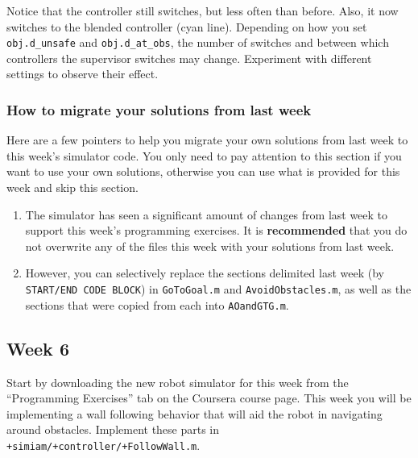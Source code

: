 \documentclass[10pt]{article}
\begin{document}
\begin{enumerate}
  Notice that the controller still switches, but less often than before. Also, it now switches to the blended controller (cyan line). Depending on how you set \texttt{obj.d\_unsafe} and \texttt{obj.d\_at\_obs}, the number of switches and between which controllers the supervisor switches may change. Experiment with different settings to observe their effect.
    
\end{enumerate}

\subsubsection*{How to migrate your solutions from last week}
Here are a few pointers to help you migrate your own solutions from last week to this week's simulator code. You only need to pay attention to this section if you want to use your own solutions, otherwise you can use what is provided for this week and skip this section.

\begin{enumerate}
 \item The simulator has seen a significant amount of changes from last week to support this week's programming exercises. It is \textbf{recommended} that you do not overwrite any of the files this week with your solutions from last week.
 \item However, you can selectively replace the sections delimited last week (by \texttt{START/END CODE BLOCK}) in \texttt{GoToGoal.m} and \texttt{AvoidObstacles.m}, as well as the sections that were copied from each into \texttt{AOandGTG.m}.
\end{enumerate}

\subsection{Week 6}

Start by downloading the new robot simulator for this week from the ``Programming Exercises'' tab on the Coursera course page. This week you will be implementing a wall following behavior that will aid the robot in navigating around obstacles. Implement these parts in \texttt{+simiam/+controller/+FollowWall.m}.
\end{document}
